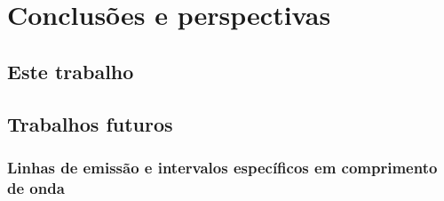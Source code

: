 


\chapter{Conclusões e perspectivas}
\label{sec:conclusao}


\section{Este trabalho}
\ojo

\section{Trabalhos futuros}

\subsection{Linhas de emissão e intervalos específicos em comprimento de onda}
\label{sec:UsoPCA:PCAlidades:emlin}

